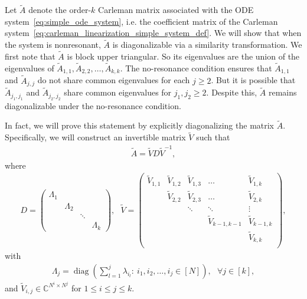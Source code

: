 \documentclass[superscriptaddress,onecolumn,nofootinbib,longbibliography,a4paper,accepted=2026-09-29]{quantumarticle}
\theoremstyle{plain}
\theoremstyle{definition}
\numberwithin{thm}{section}
\numberwithin{assumption}{section}
\numberwithin{lemma}{section}
\numberwithin{prop}{section}
\numberwithin{cor}{section}
\numberwithin{definition}{section}
\numberwithin{rmk}{section}
\numberwithin{equation}{section}
\newcommand{\myC}{\mathbb{C}}
\newcommand{\lrb}[1]{\left ( #1 \right )}
\newcommand{\diag}[1]{\operatorname{diag}\lrb{#1}}
\begin{document}
Let $\tilde{A}$ denote the order-$k$ Carleman matrix associated with the ODE system~\eqref{eq:simple_ode_system}, i.e. the coefficient matrix of the Carleman system~\eqref{eq:carleman_linearization_simple_system_def}. We will show that when the system is nonresonant, $\tilde{A}$ is diagonalizable via a similarity transformation. We first note that $\tilde{A}$ is block upper triangular. So its eigenvalues are the union of the eigenvalues of $\tilde{A}_{1,1}, \tilde{A}_{2,2}, \dots, \tilde{A}_{k,k}$. The no-resonance condition ensures that $\tilde{A}_{1,1}$ and $\tilde{A}_{j,j}$ do not share common eigenvalues for each $j\ge 2$. But it is possible that $\tilde{A}_{j_1, j_1}$ and $\tilde{A}_{j_2, j_2}$ share common eigenvalues for $j_1, j_2 \ge 2$. Despite this, $\tilde{A}$ remains diagonalizable under the no-resonance condition. 

In fact, we will prove this statement by explicitly diagonalizing the matrix $\tilde{A}$. Specifically, we will construct an invertible matrix $\tilde{V}$ such that 
\begin{align}
    \tilde{A}=\tilde{V} D \tilde{V}^{-1},    
\end{align}
where 
\begin{align}
    D=\begin{pmatrix}
        \Lambda_1  &           &        & \\
                 & \Lambda_2 &        & \\
                 &           & \ddots & \\
                 &           &      &\Lambda_k \end{pmatrix},~~~
        \tilde{V}=\begin{pmatrix}
        \tilde{V}_{1,1}  & \tilde{V}_{1,2}   &  \tilde{V}_{1,3} & \dots  & \tilde{V}_{1,k} \\
                 & \tilde{V}_{2,2}   &  \tilde{V}_{2,3} & \dots & \tilde{V}_{2,k} \\
                 &           & \ddots &   \ddots       & \vdots \\
                 &           &          & \tilde{V}_{k-1,k-1} & \tilde{V}_{k-1, k} \\
                &           &          &  & \tilde{V}_{k, k} \\\end{pmatrix}, 
                \label{eq:def_D_tildeV}
\end{align}
with
\begin{align}
    \Lambda_j=\diag{\sum_{l=1}^j \lambda_{i_l}:~i_1, i_2,\dots,i_j\in [N]}, ~~~\forall j \in [k],    
\end{align}
and $\tilde{V}_{i,j} \in \myC^{N^i \times N^j}$ for $1 \le i \le j \le k$.
\end{document}
